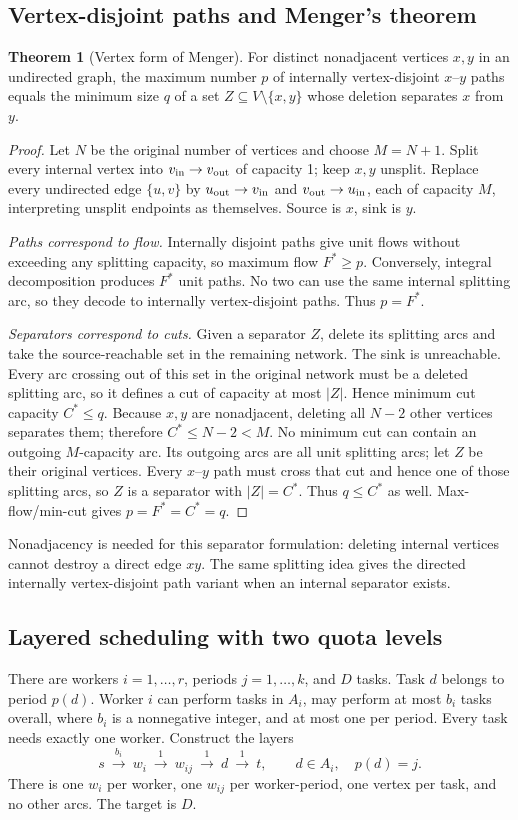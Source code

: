 \documentclass[10pt]{article}
\theoremstyle{definition}
\newtheorem{theorem}[definition]{Theorem}
\begin{document}
\subsection{Vertex-disjoint paths and Menger's theorem}\label{nf:menger}
\begin{theorem}[Vertex form of Menger]
For distinct nonadjacent vertices $x,y$ in an undirected graph, the maximum
number $p$ of internally vertex-disjoint $x$--$y$ paths equals the minimum
size $q$ of a set $Z\subseteq V\setminus\{x,y\}$ whose deletion separates
$x$ from $y$.
\end{theorem}
\begin{proof}
Let $N$ be the original number of vertices and choose $M=N+1$.
Split every internal vertex into $v_{\rm in}\to v_{\rm out}$ of capacity 1;
keep $x,y$ unsplit. Replace every undirected edge $\{u,v\}$ by
$u_{\rm out}\to v_{\rm in}$ and $v_{\rm out}\to u_{\rm in}$, each of capacity
$M$, interpreting unsplit endpoints as themselves. Source is $x$, sink is $y$.

\emph{Paths correspond to flow.} Internally disjoint paths give unit flows
without exceeding any splitting capacity, so maximum flow $F^*\ge p$.
Conversely, integral decomposition produces $F^*$ unit paths. No two can use
the same internal splitting arc, so they decode to internally vertex-disjoint
paths. Thus $p=F^*$.

\emph{Separators correspond to cuts.} Given a separator $Z$, delete its
splitting arcs and take the source-reachable set in the remaining network.
The sink is unreachable. Every arc crossing out of this set in the original
network must be a deleted splitting arc, so it defines a cut of capacity at
most $|Z|$. Hence minimum cut capacity $C^*\le q$.
Because $x,y$ are nonadjacent, deleting all $N-2$ other vertices separates
them; therefore $C^*\le N-2<M$. No minimum cut can contain an outgoing
$M$-capacity arc. Its outgoing arcs are all unit splitting arcs; let $Z$
be their original vertices. Every $x$--$y$ path must cross that cut and hence
one of those splitting arcs, so $Z$ is a separator with $|Z|=C^*$.
Thus $q\le C^*$ as well. Max-flow/min-cut gives $p=F^*=C^*=q$.
\end{proof}
Nonadjacency is needed for this separator formulation: deleting internal
vertices cannot destroy a direct edge $xy$. The same splitting idea gives
the directed internally vertex-disjoint path variant when an internal
separator exists.

\subsection{Layered scheduling with two quota levels}\label{nf:scheduling}
There are workers $i=1,\ldots,r$, periods $j=1,\ldots,k$, and $D$ tasks.
Task $d$ belongs to period $p(d)$. Worker $i$ can perform tasks in $A_i$,
may perform at most $b_i$ tasks overall, where $b_i$ is a nonnegative integer, and at most one per period.
Every task needs exactly one worker. Construct the layers
\[
 s\ \xrightarrow{\ b_i\ }\ w_i
 \ \xrightarrow{\ 1\ }\ w_{ij}
 \ \xrightarrow{\ 1\ }\ d
 \ \xrightarrow{\ 1\ }\ t,
 \qquad d\in A_i,\quad p(d)=j.
\]
There is one $w_i$ per worker, one $w_{ij}$ per worker-period, one vertex per
task, and no other arcs. The target is $D$.
\end{document}
